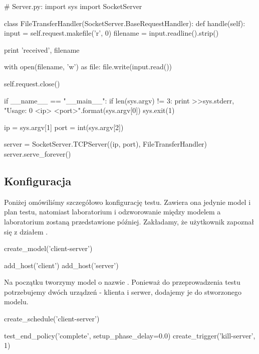 \documentclass[00-praca-magisterska.tex]{subfiles}
\begin{document}
\begin{pythoncode}
  # Server.py:
  import sys
  import SocketServer

  class FileTransferHandler(SocketServer.BaseRequestHandler):
      def handle(self):
          input  = self.request.makefile('r', 0)
          filename = input.readline().strip()

          print 'received', filename

          with open(filename, 'w') as file:
	      file.write(input.read())
  
          self.request.close()

  if __name__ == "__main__":
      if len(sys.argv) != 3:
          print >>sys.stderr, "Usage: {0} <ip> <port>".format(sys.argv[0])
          sys.exit(1)

      ip = sys.argv[1]
      port = int(sys.argv[2])

      server = SocketServer.TCPServer((ip, port), FileTransferHandler)
      server.serve_forever()

\end{pythoncode}

\subsection{Konfiguracja}

Poniżej omówiliśmy szczegółowo konfigurację testu. Zawiera ona jedynie model i
plan testu, natomiast laboratorium i odzworowanie między modelem a laboratorium
zostaną przedstawione później. Zakładamy, że użytkownik zapoznał się z działem
.

\begin{pythoncode}
  create_model('client-server')

  add_host('client')
  add_host('server')
\end{pythoncode}

Na początku tworzymy model o nazwie . Ponieważ do
przeprowadzenia testu potrzebujemy dwóch urządzeń - klienta i serwer, dodajemy
je do stworzonego modelu. 

\begin{pythoncode}
  create_schedule('client-server')

  test_end_policy('complete', setup_phase_delay=0.0)
  create_trigger('kill-server', 1)
\end{pythoncode}
\end{document}
